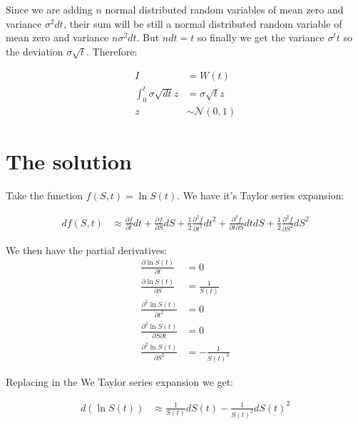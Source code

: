 \documentclass{article}
\begin{document}
Since we are adding $n$ normal distributed random variables of mean zero and variance $\sigma^2 dt$, their sum will be still a normal distributed random variable of mean zero and variance $n \sigma^2 dt$. But $n dt = t$ so finally we get the variance $\sigma^t t$ so the deviation $\sigma \sqrt{t}$. Therefore:

\begin{equation}
  \begin{aligned}
   I & = W(t) \\
   \int_{0}^{t} \sigma \sqrt{dt} z & = \sigma \sqrt{t} z \\
     z & \sim \mathcal{N}(0,1)
  \end{aligned}
\end{equation}

\section{The solution}

Take the function $f(S, t) = \ln{S(t)}$. We have it's Taylor series expansion:

\begin{equation}
  \begin{aligned}
    df(S, t) & \approx \frac{\partial f}{\partial t} dt + \frac{\partial f}{\partial S} dS + \frac{1}{2} \frac{{\partial}^2 f}{\partial t^2} {dt}^2 +
               \frac{{\partial}^2 f}{\partial t \partial S} dt dS + \frac{1}{2} \frac{{\partial}^2 f}{\partial S^2} {dS}^2
  \end{aligned}
\end{equation}

We then have the partial derivatives:
\begin{equation}
  \begin{aligned}
    \frac{\partial \ln{S(t)}}{\partial t} & = 0 \\
    \frac{\partial \ln{S(t)}}{\partial S} & = \frac{1}{S(t)} \\
    \frac{{\partial}^2 \ln{S(t)}}{\partial t^2} & = 0 \\
    \frac{{\partial}^2 \ln{S(t)}}{\partial S \partial t} & = 0 \\
    \frac{{\partial}^2 \ln{S(t)}}{\partial S^2} & = - \frac{1}{{S(t)}^2}
  \end{aligned}
\end{equation}

Replacing in the We Taylor series expansion we get:

\begin{equation}
  \begin{aligned}
    d \left( \ln{S(t)} \right) & \approx \frac{1}{S(t)} dS(t) - \frac{1}{S(t)^2} {dS(t)}^2
  \end{aligned}
\end{equation}
\end{document}
